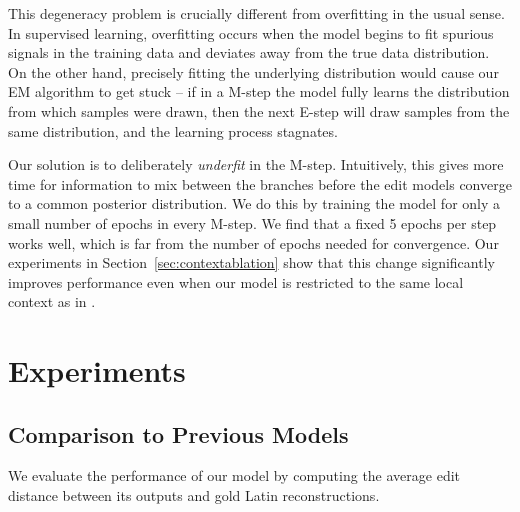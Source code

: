 \documentclass[11pt]{article}
\begin{document}
This degeneracy problem is crucially different from overfitting in the usual sense. In supervised learning, overfitting occurs when the model begins to fit spurious signals in the training data and deviates away from the true data distribution. On the other hand, precisely fitting the underlying distribution would cause our EM algorithm to get stuck -- if in a M-step the model fully learns the distribution from which samples were drawn, then the next E-step will draw samples from the same distribution, and the learning process stagnates. 

Our solution is to deliberately \textit{underfit} in the M-step. Intuitively, this gives more time for information to mix between the branches before the edit models converge to a common posterior distribution. We do this by training the model for only a small number of epochs in every M-step. We find that a fixed 5 epochs per step works well, which is far from the number of epochs needed for convergence. Our experiments in Section~\ref{sec:contextablation} show that this change significantly improves performance even when our model is restricted to the same local context as in \citet{bouchard-cote-etal-2009-improved}. %


\section{Experiments}
\label{sec:experiments}

\subsection{Comparison to Previous Models}
\label{sec:comparison}
We evaluate the performance of our model by computing the average edit distance between its outputs and gold Latin reconstructions. 
\end{document}
